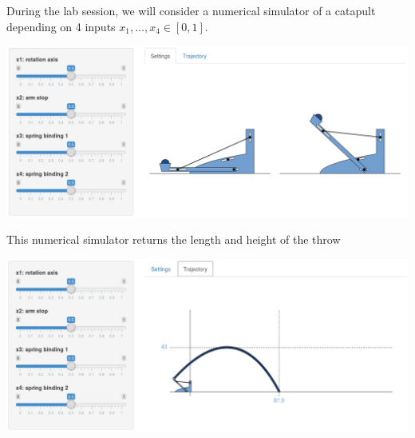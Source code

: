 \documentclass{beamer}
\begin{document}
\begin{frame}{}
During the lab session, we will consider a numerical simulator of a catapult depending on 4 inputs $ x_1,\dots,x_4 \in [0,1]$.
\begin{center}
\includegraphics[width=\textwidth]{figures/catapult_settings}
\end{center}
\end{frame}

\begin{frame}{}
This numerical simulator returns the length and height of the throw
\begin{center}
\includegraphics[width=\textwidth]{figures/catapult_trajectory}
\end{center}
\end{frame}
\end{document}
